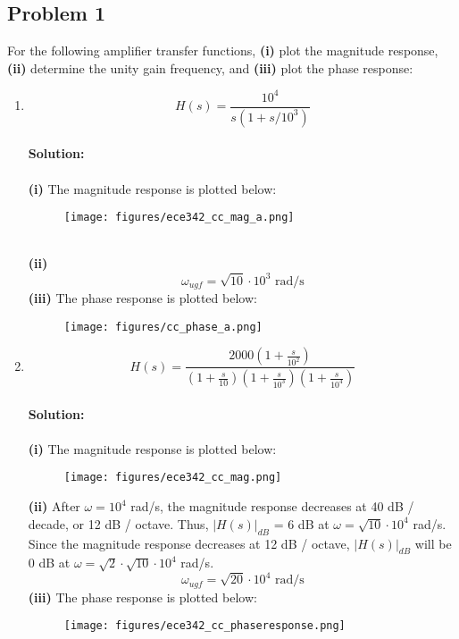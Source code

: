\documentclass{article}
\begin{document}
\subsection*{Problem 1}
For the following amplifier transfer functions, \textbf{(i)} plot the magnitude response, \textbf{(ii)} determine the unity gain frequency, and \textbf{(iii)} plot the phase response:
\begin{enumerate}[label=\textbf{(\alph*)}]
    \item $$H(s) = \frac{10^4}{s(1+s/10^3)}$$
    \\ \textbf{Solution:}\\ \\
    \textbf{(i)} The magnitude response is plotted below:
    \begin{figure}[!h]
    \centering
    \texttt{[image: figures/ece342\_cc\_mag\_a.png]}
    \end{figure} \\
    \textbf{(ii)} 
    $$\boxed{\omega_{ugf} = \sqrt{10} \cdot 10^3 \text{ rad/s}}$$
    \newpage
    \textbf{(iii)} The phase response is plotted below:
    \begin{figure}[!h]
    \centering
    \texttt{[image: figures/cc\_phase\_a.png]}
    \end{figure}
    \item $$H(s) = \frac{2000\left(1 + \frac{s}{10^2}\right)}{\left(1 + \frac{s}{10}\right)\left(1 + \frac{s}{10^3}\right)\left(1 + \frac{s}{10^4}\right)}$$
    \\ \textbf{Solution:}\\ \\
    \textbf{(i)} The magnitude response is plotted below:
    \begin{figure}[!h]
    \centering
    \texttt{[image: figures/ece342\_cc\_mag.png]}
    \end{figure} \newpage
    \textbf{(ii)} After $\omega = 10^4$ rad/s, the magnitude response decreases at 40 dB / decade, or 12 dB / octave.  Thus, $|H(s)|_{dB}$ =  6 dB at $\omega = \sqrt{10} \cdot 10^4$ rad/s.  Since the magnitude response decreases at 12 dB / octave, $|H(s)|_{dB}$ will be 0 dB at $\omega = \sqrt{2} \cdot \sqrt{10} \cdot 10^4$ rad/s.
    $$\boxed{\omega_{ugf} = \sqrt{20} \cdot 10^4 \text{ rad/s}}$$
    \textbf{(iii)} The phase response is plotted below:
    \begin{figure}[!h]
    \centering
    \texttt{[image: figures/ece342\_cc\_phaseresponse.png]}
    \end{figure}

\end{enumerate}
\end{document}
